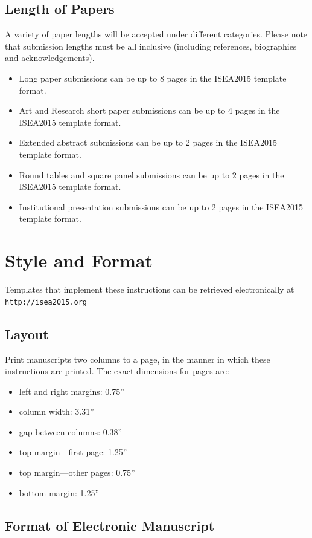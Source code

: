 \documentclass[letterpaper]{article}
\begin{document}
\subsection{Length of Papers}

A variety of paper lengths will be accepted under different categories. Please note that submission lengths must be all inclusive (including references, biographies and acknowledgements).
\begin{itemize}
\item Long paper submissions can be up to 8 pages in the ISEA2015 template format.
\item Art and Research short paper submissions can be up to 4 pages in the ISEA2015 template format.
\item Extended abstract submissions can be up to 2 pages in the ISEA2015 template format.
\item Round tables and square panel submissions can be up to 2 pages in the ISEA2015 template format.
\item Institutional presentation submissions can be up to 2 pages in the ISEA2015 template format.
\end{itemize}

\section{Style and Format}
Templates that implement these instructions can be retrieved electronically at {\small \tt http://isea2015.org}

\subsection{Layout}

Print manuscripts two columns to a page, in the manner in which these instructions are printed. The exact dimensions for pages are:
\begin{itemize}
\item left and right margins: 0.75''
\item column width: 3.31''
\item gap between columns: 0.38''
\item top margin—first page: 1.25''
\item top margin—other pages: 0.75''
\item bottom margin: 1.25''
\end{itemize}

\subsection{Format of Electronic Manuscript}
\end{document}
